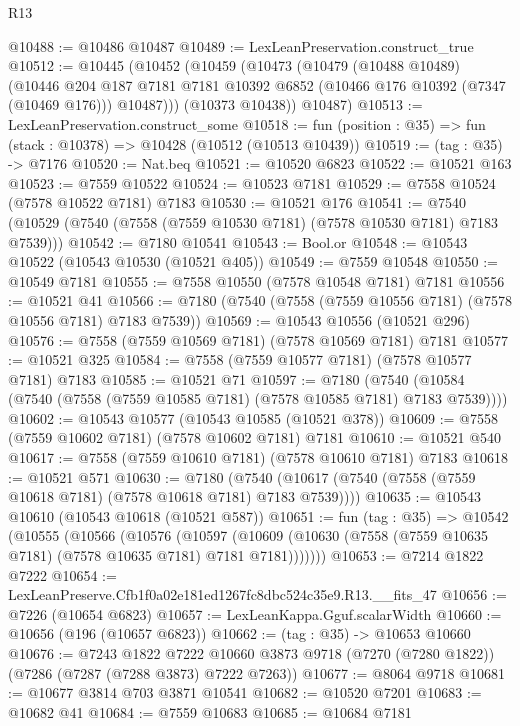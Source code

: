 \begin{lexlean}{R13}
\begin{coremodule}
@10488 := @10486 @10487
@10489 := LexLeanPreservation.construct_true
@10512 := @10445
    (@10452
      (@10459
        (@10473
          (@10479
            (@10488 @10489)
            (@10446
              @204
              @187
              @7181
              @7181
              @10392
              @6852
              (@10466 @176 @10392 (@7347 (@10469 @176)))
              @10487)))
        (@10373 @10438))
      @10487)
@10513 := LexLeanPreservation.construct_some
@10518 := fun (position : @35) => fun (stack : @10378) => @10428 (@10512 (@10513 @10439))
@10519 := (tag : @35) -> @7176
@10520 := Nat.beq
@10521 := @10520 @6823
@10522 := @10521 @163
@10523 := @7559 @10522
@10524 := @10523 @7181
@10529 := @7558 @10524 (@7578 @10522 @7181) @7183
@10530 := @10521 @176
@10541 := @7540 (@10529 (@7540 (@7558 (@7559 @10530 @7181) (@7578 @10530 @7181) @7183 @7539)))
@10542 := @7180 @10541
@10543 := Bool.or
@10548 := @10543 @10522 (@10543 @10530 (@10521 @405))
@10549 := @7559 @10548
@10550 := @10549 @7181
@10555 := @7558 @10550 (@7578 @10548 @7181) @7181
@10556 := @10521 @41
@10566 := @7180 (@7540 (@7558 (@7559 @10556 @7181) (@7578 @10556 @7181) @7183 @7539))
@10569 := @10543 @10556 (@10521 @296)
@10576 := @7558 (@7559 @10569 @7181) (@7578 @10569 @7181) @7181
@10577 := @10521 @325
@10584 := @7558 (@7559 @10577 @7181) (@7578 @10577 @7181) @7183
@10585 := @10521 @71
@10597 := @7180
    (@7540 (@10584 (@7540 (@7558 (@7559 @10585 @7181) (@7578 @10585 @7181) @7183 @7539))))
@10602 := @10543 @10577 (@10543 @10585 (@10521 @378))
@10609 := @7558 (@7559 @10602 @7181) (@7578 @10602 @7181) @7181
@10610 := @10521 @540
@10617 := @7558 (@7559 @10610 @7181) (@7578 @10610 @7181) @7183
@10618 := @10521 @571
@10630 := @7180
    (@7540 (@10617 (@7540 (@7558 (@7559 @10618 @7181) (@7578 @10618 @7181) @7183 @7539))))
@10635 := @10543 @10610 (@10543 @10618 (@10521 @587))
@10651 := fun (tag : @35) =>
  @10542
    (@10555
      (@10566
        (@10576
          (@10597
            (@10609 (@10630 (@7558 (@7559 @10635 @7181) (@7578 @10635 @7181) @7181 @7181)))))))
@10653 := @7214 @1822 @7222
@10654 := LexLeanPreserve.Cfb1f0a02e181ed1267fc8dbc524c35e9.R13.__fits_47
@10656 := @7226 (@10654 @6823)
@10657 := LexLeanKappa.Gguf.scalarWidth
@10660 := @10656 (@196 (@10657 @6823))
@10662 := (tag : @35) -> @10653 @10660
@10676 := @7243
    @1822
    @7222
    @10660
    @3873
    @9718
    (@7270 (@7280 @1822))
    (@7286 (@7287 (@7288 @3873) @7222 @7263))
@10677 := @8064 @9718
@10681 := @10677 @3814 @703 @3871 @10541
@10682 := @10520 @7201
@10683 := @10682 @41
@10684 := @7559 @10683
@10685 := @10684 @7181

\end{coremodule}
\end{lexlean}
